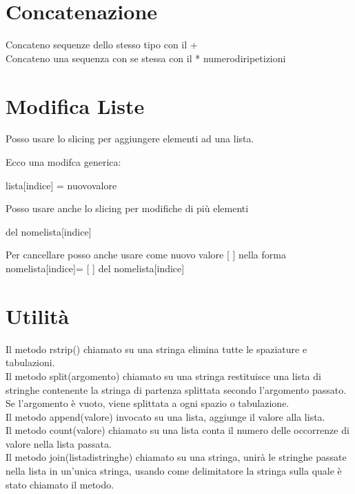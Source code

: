 \section{Concatenazione}
Concateno sequenze dello stesso tipo con il +\\
Concateno una sequenza con se stessa con il * numerodiripetizioni\\

\section{Modifica Liste}
Posso usare lo slicing per aggiungere elementi ad una lista.


Ecco una modifca generica:

\begin{py}
lista[indice] = nuovovalore
\end{py}

Posso usare anche lo slicing per modifiche di più elementi\\

\begin{py}
del nomelista[indice]
\end{py}

Per cancellare posso anche usare come nuovo valore [ ] nella forma nomelista[indice]= [ ]  del nomelista[indice]

\section{Utilità}
Il metodo rstrip() chiamato su una stringa elimina tutte le spaziature e tabulazioni.\\
Il metodo split(argomento) chiamato su una stringa restituisce una lista di stringhe contenente la stringa di partenza splittata secondo l'argomento passato. Se l'argomento è vuoto, viene splittata a ogni spazio o tabulazione.\\
Il metodo append(valore) invocato su una lista, aggiunge il valore alla lista.\\
Il metodo count(valore) chiamato su una lista conta il numero delle occorrenze di valore nella lista passata.\\
Il metodo join(listadistringhe) chiamato su una stringa, unirà le stringhe passate nella lista in un'unica stringa, usando come delimitatore la stringa sulla quale è stato chiamato il metodo.\\

